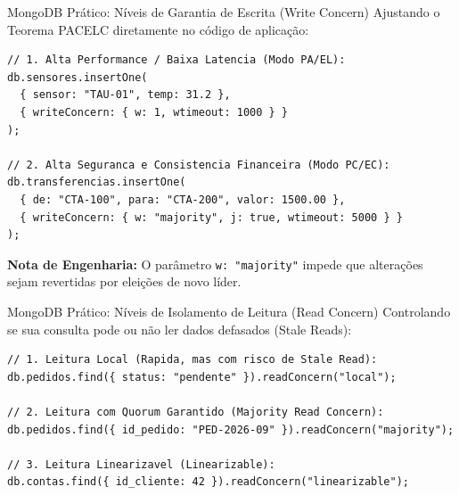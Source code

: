 \begin{frame}[fragile]{MongoDB Prático: Níveis de Garantia de Escrita (Write Concern)}
\vspace{-0.2cm}
\alert{Ajustando o Teorema PACELC diretamente no código de aplicação:}\par
\vspace{0.1cm}
\begin{lstlisting}
// 1. Alta Performance / Baixa Latencia (Modo PA/EL):
db.sensores.insertOne(
  { sensor: "TAU-01", temp: 31.2 },
  { writeConcern: { w: 1, wtimeout: 1000 } }
);

// 2. Alta Seguranca e Consistencia Financeira (Modo PC/EC):
db.transferencias.insertOne(
  { de: "CTA-100", para: "CTA-200", valor: 1500.00 },
  { writeConcern: { w: "majority", j: true, wtimeout: 5000 } }
);
\end{lstlisting}
\vspace{-0.1cm}
\centering
{\scriptsize \textbf{Nota de Engenharia:} O parâmetro \texttt{w: "majority"} impede que alterações sejam revertidas por eleições de novo líder.}
\end{frame}

\begin{frame}[fragile]{MongoDB Prático: Níveis de Isolamento de Leitura (Read Concern)}
\vspace{-0.2cm}
\alert{Controlando se sua consulta pode ou não ler dados defasados (Stale Reads):}\par
\vspace{0.1cm}
\begin{lstlisting}
// 1. Leitura Local (Rapida, mas com risco de Stale Read):
db.pedidos.find({ status: "pendente" }).readConcern("local");

// 2. Leitura com Quorum Garantido (Majority Read Concern):
db.pedidos.find({ id_pedido: "PED-2026-09" }).readConcern("majority");

// 3. Leitura Linearizavel (Linearizable):
db.contas.find({ id_cliente: 42 }).readConcern("linearizable");
\end{lstlisting}
\end{frame}

